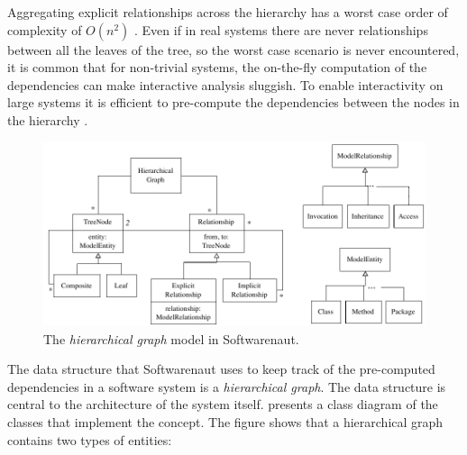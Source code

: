 \documentclass[preprint,12pt]{elsarticle}
\newcommand\on[1]{\nbc{ON}{#1}{red}} %
\newcommand{\eg}{\emph{e.g.},\xspace}
\begin{document}

Aggregating explicit relationships across the hierarchy has a worst case order of complexity of $O(n^2)$ \cite{buchsbaum-hierarchicalgraphs}. Even if in real systems there are never relationships between all the leaves of the tree, so the worst case scenario is never encountered, it is common that for non-trivial systems, the on-the-fly computation of the dependencies can make interactive analysis sluggish. To enable interactivity on large systems it is efficient to pre-compute the dependencies between the nodes in the hierarchy \cite{buchsbaum-hierarchicalgraphs}.



\begin{figure}[ht]
\begin{center}
\includegraphics[width=\linewidth]{HigraphModel}
\caption{The {\em hierarchical graph} model in Softwarenaut.
}
\end{center}
\end{figure}

The data structure that Softwarenaut uses to keep track of the pre-computed dependencies in a software system is a {\em hierarchical graph}. The data structure is central to the architecture of the system itself.  presents a class diagram of the classes that implement the concept. The figure shows that a hierarchical graph contains two types of entities: 
\end{document}

